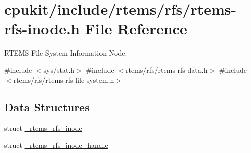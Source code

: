 \hypertarget{rtems-rfs-inode_8h}{}\section{cpukit/include/rtems/rfs/rtems-\/rfs-\/inode.h File Reference}
\label{rtems-rfs-inode_8h}


R\+T\+E\+MS File System Information Node.  


{\ttfamily \#include $<$sys/stat.\+h$>$}\newline
{\ttfamily \#include $<$rtems/rfs/rtems-\/rfs-\/data.\+h$>$}\newline
{\ttfamily \#include $<$rtems/rfs/rtems-\/rfs-\/file-\/system.\+h$>$}\newline
\subsection*{Data Structures}
\begin{DoxyCompactItemize}
\item 
struct \mbox{\hyperlink{struct__rtems__rfs__inode}{\+\_\+rtems\+\_\+rfs\+\_\+inode}}
\item 
struct \mbox{\hyperlink{struct__rtems__rfs__inode__handle}{\+\_\+rtems\+\_\+rfs\+\_\+inode\+\_\+handle}}
\end{DoxyCompactItemize}
